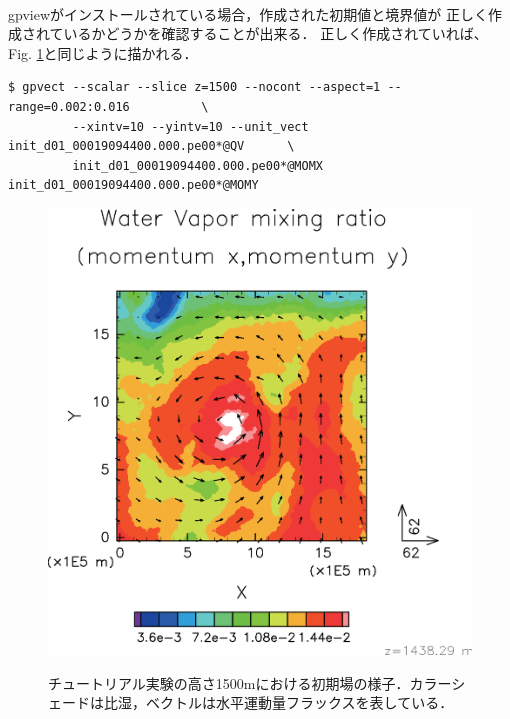 \vspace{1cm}
\\
gpviewがインストールされている場合，作成された初期値と境界値が
正しく作成されているかどうかを確認することが出来る．
正しく作成されていれば、
Fig. \ref{fig:init}と同じように描かれる．

\begin{verbatim}
$ gpvect --scalar --slice z=1500 --nocont --aspect=1 --range=0.002:0.016          \
         --xintv=10 --yintv=10 --unit_vect init_d01_00019094400.000.pe00*@QV      \
         init_d01_00019094400.000.pe00*@MOMX init_d01_00019094400.000.pe00*@MOMY
\end{verbatim}


\begin{figure}[h]
\begin{center}
  \includegraphics[width=0.7\hsize]{./figure/init_qv-momxy.eps}\\
  \caption{チュートリアル実験の高さ1500mにおける初期場の様子．カラーシェードは比湿，ベクトルは水平運動量フラックスを表している．}
  \label{fig:init}
\end{center}
\end{figure}

